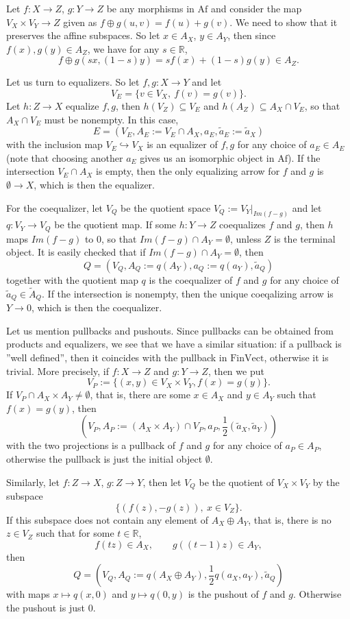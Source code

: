 \documentclass[12pt]{article}
\theoremstyle{definition}
\theoremstyle{remark}
\def \Af{\mathrm{Af}}
\def \FV{\mathrm{FinVect}}
\def\bE{ E}
\def\bX{ X}
\def\bY{ Y}
\def\bZ{Z}
\begin{document}
Let  $f:\bX\to \bZ$, $g:\bY\to \bZ$ be any morphisms in $\Af$ and consider the map
$V_\bX\times V_\bY\to \bZ$ given as
$f\oplus g(u,v)=f(u)+g(v)$. We need to show that it preserves the affine subspaces. So let 
$x\in A_\bX$, $y\in  A_\bY$, then since $f(x),g(y)\in A_\bZ$, we have for any $s\in \mathbb R$,
\[
f\oplus g(sx,(1-s)y)=sf(x)+(1-s)g(y)\in A_\bZ.
\]


Let us turn to equalizers. So let $f,g:\bX\to \bY$ and let 
\[
V_E=\{v\in V_\bX,\ f(v)=g(v)\}. 
\]
Let $h: \bZ\to \bX$ equalize $f,g$, then $h(V_\bZ)\subseteq V_E$ and $h(A_\bZ)\subseteq
A_\bX\cap V_E$, so that $A_\bX\cap V_E$ must be nonempty. In this case, 
\[
\bE=(V_E, A_E:=V_E\cap A_\bX, a_E,\tilde a_E:=\tilde a_X)
\]
with the inclusion map $V_E\hookrightarrow V_\bX$ is an
equalizer of $f,g$ for any choice of $a_E\in A_E$ (note that choosing another $a_E$ gives
us an isomorphic object in $\Af$). If the
intersection $V_E\cap A_\bX$ is empty, then the only equalizing arrow 
for $f$ and $g$ is $\emptyset\to \bX$, which is
then the equalizer.

For the coequalizer, let $V_Q$ be the quotient space $V_Q:=V_\bY|_{Im(f-g)}$ and let
$q:V_\bY\to V_Q$
be the quotient map. If  some $h: \bY\to \bZ$ coequalizes $f$ and $g$, then $h$ maps
$Im(f-g)$ to 0, so that $Im(f-g)\cap A_\bY=\emptyset$, unless $\bZ$ is the terminal
object. It is easily checked that if $Im(f-g)\cap A_\bY=\emptyset$, then
\[
Q=(V_Q,A_Q:=q(A_\bY),a_Q:=q(a_Y),\tilde a_Q )
\]
together with the quotient map  $q$ is the
coequalizer of $f$ and $g$ for any choice of $\tilde a_Q\in \tilde A_Q$.
If the intersection is nonempty,
then the unique coeqalizing arrow is $\bY\to 0$, which is then the coequalizer.

Let us mention pullbacks and pushouts. Since pullbacks can be obtained from products and
equalizers, we see that we have a similar situation: if a pullback is ''well defined'',
then it coincides with the pullback in $\FV$, otherwise it is trivial. More precisely, if 
$f:\bX\to \bZ$ and $g:\bY\to \bZ$, then we put 
\[
V_P:=\{(x,y)\in V_\bX\times V_\bY, f(x)=g(y)\}.
\]
If $V_P\cap A_\bX\times A_\bY\ne \emptyset$, that is, there are some $x\in A_\bX$ and $y\in
A_\bY$ such that $f(x)=g(y)$, then 
\[
(V_P,A_P:=(A_\bX\times A_\bY)\cap V_P, a_P, \frac 12(\tilde a_X,\tilde a_Y))
\]
with the two projections
is a pullback of $f$ and $g$ for any choice of $a_P\in A_P$, otherwise the pullback is
just the initial object $\emptyset$.

Similarly, let $f:\bZ\to \bX$, $g:\bZ\to \bY$, then let $V_Q$ be the quotient of
$V_\bX\times V_\bY$ by the subspace
\[
\{(f(z),-g(z)),\ x\in V_\bZ\}.
\]
If this subspace does not contain any element of $A_\bX\oplus A_\bY$, that is, there is no
$z\in V_\bZ$ such that for some $t\in \mathbb R$,
\[
f(tz)\in A_\bX,\qquad g((t-1)z)\in A_\bY,
\]
then 
\[
Q=(V_Q, A_Q:=q(A_\bX\oplus A_\bY), \frac12 q(a_X,a_Y), \tilde a_Q)
\]
with maps $x\mapsto q(x,0)$ and $y\mapsto q(0,y)$ is the
pushout of $f$ and $g$. Otherwise the pushout is just $0$.
\end{document}
